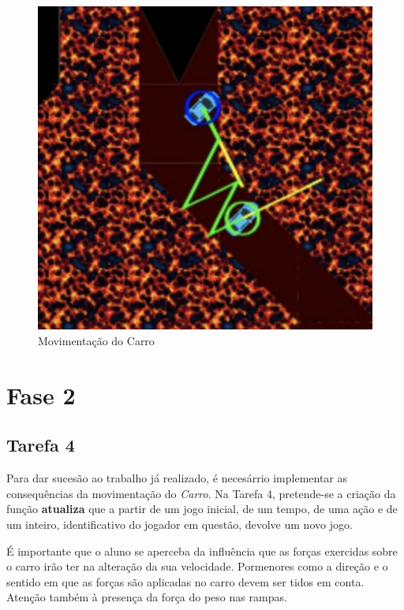 \documentclass[a4paper]{report} %
\begin{document}
 \begin{figure}[!h]
    
    \centering
    \includegraphics[scale= 0.5]{Imagens/colisao.jpg}
    \caption{Movimentação do Carro}
 
 \end{figure}

\newpage

\section{Fase 2}
\label{sec:analisefasee}
 
\subsection{Tarefa 4}
 
 Para dar sucesão ao trabalho já realizado, é necesárrio implementar as consequências da movimentação do \emph{Carro}. Na Tarefa 4, pretende-se a criação da função \textbf{atualiza} que a partir de um jogo inicial, de um tempo, de uma ação e de um inteiro, identificativo do jogador em questão, devolve um novo jogo. 
 
 É importante que o aluno se aperceba da influência que as forças exercidas sobre o carro irão ter na alteração da sua velocidade. Pormenores como a direção e o sentido em que as forças são aplicadas no carro devem ser tidos em conta. Atenção também à presença da força do peso nas rampas.
 
\end{document}
